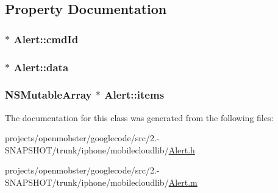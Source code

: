 \subsection{\-Property \-Documentation}
\hypertarget{interface_alert_af1a14c340c81492b37dcb9df0c5ae328}{
\subsubsection[{cmd\-Id}]{ $\ast$ \-Alert\-::cmd\-Id}}
\label{interface_alert_af1a14c340c81492b37dcb9df0c5ae328}
\hypertarget{interface_alert_a5dfd8afa627ed7494584f18d96b88d3a}{
\subsubsection[{data}]{ $\ast$ \-Alert\-::data}}
\label{interface_alert_a5dfd8afa627ed7494584f18d96b88d3a}
\hypertarget{interface_alert_a307ae58151e1590ab60f5b61fb49b0f7}{
\subsubsection[{items}]{\setlength{\rightskip}{0pt plus 5cm}\-N\-S\-Mutable\-Array $\ast$ \-Alert\-::items}}
\label{interface_alert_a307ae58151e1590ab60f5b61fb49b0f7}


\-The documentation for this class was generated from the following files\-:\begin{DoxyCompactItemize}
\item 
projects/openmobster/googlecode/src/2.-\/\-S\-N\-A\-P\-S\-H\-O\-T/trunk/iphone/mobilecloudlib/\hyperlink{_alert_8h}{\-Alert.\-h}\item 
projects/openmobster/googlecode/src/2.-\/\-S\-N\-A\-P\-S\-H\-O\-T/trunk/iphone/mobilecloudlib/\hyperlink{_alert_8m}{\-Alert.\-m}\end{DoxyCompactItemize}
